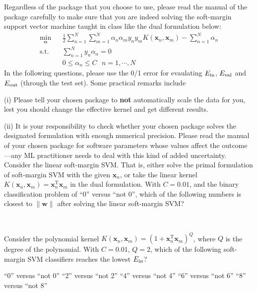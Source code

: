 \documentclass[a4paper,10pt]{exam}
\begin{document}
\begin{questions}
  Regardless of the package that you choose to use, please read the manual of the package carefully to make sure that you are indeed solving the soft-margin support vector machine taught in class like the dual formulation below:
  \begin{eqnarray*}
  	\min_{\boldsymbol\alpha} && 
  	\frac{1}{2} \sum_{n=1}^N \sum_{m=1}^N \alpha_n \alpha_m y_n y_m K(\mathbf{x}_n, \mathbf{x}_m)
  	- \sum_{n=1}^N \alpha_n \\
  	\mathrm{s.t.}        && \sum_{n=1}^N y_n \alpha_n = 0 \\ 
  	&& 0 \leq \alpha_n \leq C \ \ \ n=1,\cdots,N
  \end{eqnarray*}
  In the following questions, please use the 0/1 error for evaulating $E_{\rm in}$, $E_{\rm val}$ and $E_{\rm out}$ (through the test set). Some practical remarks include
  
  (i) Please tell your chosen package to \textbf {not} automatically scale the data for you, lest you should change the effective kernel and get different results.
  
  (ii) It is your responsibility to check whether your chosen package solves the designated formulation with enough numerical precision. Please read the manual of your chosen package for software parameters whose values affect the outcome---any ML practitioner needs to deal with this kind of added uncertainty.
  Consider the linear soft-margin SVM. That is, either solve the primal formulation of soft-margin SVM with the given $\mathbf{x}_n$, or take the linear kernel $K(\mathbf{x}_n,\mathbf{x}_m) = \mathbf{x}_n^{\mathrm{T}} \mathbf{x}_m$ in the dual formulation. With $C=0.01$, and the binary classification problem of ``0'' versus ``not 0'', which of the following numbers is closest to $\|\mathbf{w}\|$ after solving the linear soft-margin SVM?
  \begin{checkboxes}
  	\\
  \end{checkboxes}
  
  \question Consider the polynomial kernel $K(\mathbf{x}_n,\mathbf{x}_m) = (1+ \mathbf{x}_n^{\mathrm{T}} \mathbf{x}_m)^Q$, where $Q$ is the degree of the polynomial. With $C=0.01$, $Q=2$, which of the following soft-margin SVM classifiers reaches the lowest $E_{\rm in}$?
  \begin{checkboxes}
  	\choice ``0'' versus ``not 0''
  	\choice ``2'' versus ``not 2''
  	\choice ``4'' versus ``not 4''
  	\choice ``6'' versus ``not 6''
  	\CorrectChoice ``8'' versus ``not 8''\\
  \end{checkboxes}
  

\end{questions}
\end{document}

